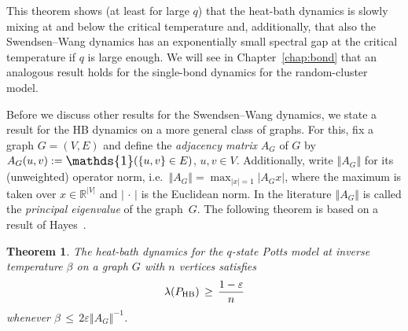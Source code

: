 \documentclass{dis}
\newtheorem{theorem}{Theorem}[chapter]
\theoremstyle{citing}
\begin{document}
This theorem shows (at least for large $q$) that the 
heat-bath dynamics is slowly mixing at and below the critical 
temperature and, additionally, that also the Swendsen--Wang dynamics 
has an exponentially small spectral gap at the 
critical temperature if $q$ is large enough.
We will see in Chapter~\ref{chap:bond} that an analogous 
result holds for the single-bond dynamics for the 
random-cluster model.

Before we discuss other results for the Swendsen--Wang 
dynamics, we state a result for the HB dynamics on 
a more general class of graphs. 
For this, fix a graph $G=(V,E)$ and define the 
\emph{adjacency matrix} $A_G$ 
of $G$ by $A_G(u,v):={\scalebox{1.2}{\raisebox{-0.2mm}{$\mathds{1}$}}}(\{u,v\}\in E)$, $u,v\in V$.
Additionally, write ${\left\Vert {A_G} \right\Vert}$ for its (unweighted) 
operator norm, i.e.~${\left\Vert {A_G} \right\Vert}=\max_{{\left\vert {x} \right\vert}=1}{\left\vert {A_G x} \right\vert}$, 
where the maximum is taken over $x\in{\ensuremath{\mathbb{R}}}^{{\left\vert {V} \right\vert}}$ and 
${\left\vert {\,\cdot\,} \right\vert}$ is the Euclidean norm.
In the literature ${\left\Vert {A_G} \right\Vert}$ is called the 
\emph{principal eigenvalue} of the graph~$G$.
The following theorem is based on a result of Hayes~\cite{Ha}.

\begin{theorem}\label{th:HB_degree}
The heat-bath dynamics for the $q$-state Potts model  
at inverse temperature $\beta$
on a graph $G$ with $n$ vertices 
satisfies
\[
\lambda({P_{\rm HB}}) \,\ge\, \frac{1-{\varepsilon}}{n}
\]
whenever $\beta\,\le\,2{\varepsilon}{\left\Vert {A_G} \right\Vert}^{-1}$.
\end{theorem}
\end{document}
